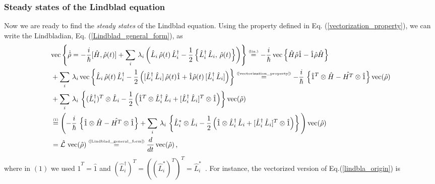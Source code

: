 \documentclass[11pt]{article}
\numberwithin{equation}{section} %
\numberwithin{figure}{section} %
\newcommand\numeq[1] %
  {\stackrel{\scriptscriptstyle(\mkern-1.5mu#1\mkern-1.5mu)}{=}}
\begin{document}
\begin{appendices}
\subsubsection{Steady states of the Lindblad equation} \label{steady_Lindblad}
Now we are ready to find the \emph{steady states} of the Lindblad equation. Using the property defined in Eq. (\ref{vectorization_property}), we can write the Lindbladian, Eq. (\ref{Lindblad_general_form}), as
\begin{equation} \label{Lindblad_vectorization}
\begin{split}
&\textrm{vec} \left\lbrace   \dot{\hat{\rho}} = -\frac{i}{\hbar}[\hat{H},\hat{\rho}(t)]+\sum_{i}\,\lambda_i\left(\hat{L}_i\,\hat{\rho}(t)\,\hat{L}_i^\dagger -\frac{1}{2}\left\lbrace\hat{L}_i^\dagger\,\hat{L}_i,\,\hat{\rho}(t)\right\rbrace\right) \right\rbrace \numeq{\textrm{lin.}} -\frac{i}{\hbar}\,\textrm{vec} \left\lbrace \hat{H}\hat{\rho}\hat{1} - \hat{1}\hat{\rho}\hat{H}  \right\rbrace \\
&+\sum_i\,\lambda_i\,\textrm{vec} \left\lbrace  \hat{L}_i\,\hat{\rho}(t)\,\hat{L}_i^\dagger -\frac{1}{2}\left([\hat{L}_i^\dagger\,\hat{L}_i]\,\hat{\rho}(t)\hat{1} + \hat{1}\hat{\rho}(t)\,[\hat{L}_i^\dagger\,\hat{L}_i]  \right) \right\rbrace  \numeq{\textrm{\ref{vectorization_property}}} -\frac{i}{\hbar}\,\left\lbrace \hat{1}^T\otimes\hat{H} -  \hat{H^T}\otimes\hat{1} \right\rbrace\textrm{vec}(\hat{\rho}) \\
& +\sum_i\,\lambda_i\, \left\lbrace  (\hat{L}_i^\dagger)^T\otimes\hat{L}_i -\frac{1}{2}\left(\hat{1}^T\otimes\hat{L}_i^\dagger\,\hat{L}_i + [\hat{L}_i^\dagger\,\hat{L}_i]^T\otimes\hat{1}  \right) \right\rbrace \textrm{vec}(\hat{\rho})\\
&\numeq{1} \left( -\frac{i}{\hbar}\,\left\lbrace \hat{1}\otimes\hat{H} -  \hat{H^T}\otimes\hat{1} \right\rbrace +\sum_i\,\lambda_i\, \left\lbrace  \hat{L}_i^*\otimes\hat{L}_i -\frac{1}{2}\left(\hat{1}\otimes\hat{L}_i^\dagger\,\hat{L}_i + [\hat{L}_i^\dagger\,\hat{L}_i]^T\otimes\hat{1}  \right) \right\rbrace\,\right) \textrm{vec}(\hat{\rho})\\
&= \hat{\mathcal{L}}\,\,\textrm{vec}(\hat{\rho}) \numeq{\textrm{\ref{Lindblad_general_form}}} \frac{d}{dt}\,\textrm{vec}(\hat{\rho})  \,\textrm{,}
\end{split}
\end{equation} 
where in $(1)$ we used $\hat{1}^T=\hat{1}$ and $(\hat{L}_i^\dagger)^T=((\hat{L}_i^*)^T)^T=\hat{L}_i^*$ $\,$. For instance, the vectorized version of Eq.(\ref{lindbla_origin}) is 
\begin{equation}

\end{equation}
\end{appendices}
\end{document}
